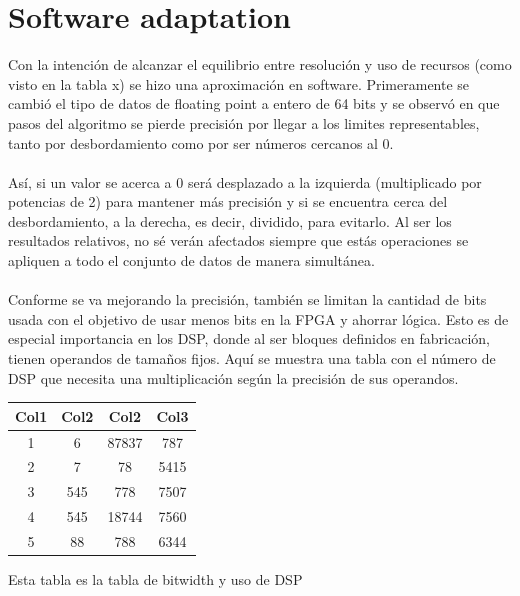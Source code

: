 \section{Software adaptation}
Con la intención de alcanzar el equilibrio entre resolución y uso de recursos (como visto en la tabla x) se hizo una aproximación en software. Primeramente se cambió el tipo de datos de floating point a entero de 64 bits y se observó en que pasos del algoritmo se pierde precisión por llegar a los limites representables, tanto por desbordamiento como por ser números cercanos al 0.
\\
\\
Así, si un valor se acerca a 0 será desplazado a la izquierda (multiplicado por potencias de 2) para mantener más precisión y si se encuentra cerca del desbordamiento, a la derecha, es decir, dividido, para evitarlo. Al ser los resultados relativos, no sé verán afectados siempre que estás operaciones se apliquen a todo el conjunto de datos de manera simultánea.
\\
\\
Conforme se va mejorando la precisión, también se limitan la cantidad de bits usada con el objetivo de usar menos bits en la FPGA y ahorrar lógica. Esto es de especial importancia en los DSP, donde al ser bloques definidos en fabricación, tienen operandos de tamaños fijos. Aquí se muestra una tabla con el número de DSP que necesita una multiplicación según la precisión de sus operandos.
\\
\begin{center}
 \begin{tabular}{||c c c c||} 
 \hline
 Col1 & Col2 & Col2 & Col3 \\ [0.5ex] 
 \hline\hline
 1 & 6 & 87837 & 787 \\ 
 \hline
 2 & 7 & 78 & 5415 \\
 \hline
 3 & 545 & 778 & 7507 \\
 \hline
 4 & 545 & 18744 & 7560 \\
 \hline
 5 & 88 & 788 & 6344 \\ [1ex] 
 \hline
\end{tabular}
\end{center}
Esta tabla es la tabla de bitwidth y uso de DSP

